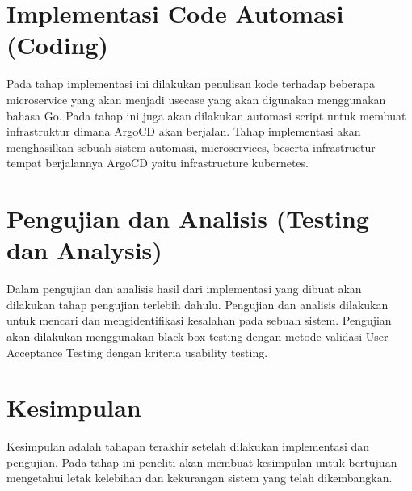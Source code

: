 \section{Implementasi Code Automasi (Coding)}
Pada tahap implementasi ini dilakukan penulisan kode terhadap beberapa microservice yang akan menjadi usecase yang akan digunakan menggunakan bahasa Go.
Pada tahap ini juga akan dilakukan automasi script untuk membuat infrastruktur dimana ArgoCD akan berjalan. Tahap implementasi akan menghasilkan sebuah sistem automasi, microservices,
beserta infrastructur tempat berjalannya ArgoCD yaitu infrastructure kubernetes.

\section{Pengujian dan Analisis (Testing dan Analysis)}
Dalam pengujian dan analisis hasil dari implementasi yang dibuat akan dilakukan tahap pengujian terlebih dahulu.
Pengujian dan analisis dilakukan untuk mencari dan mengidentifikasi kesalahan pada sebuah sistem. Pengujian akan dilakukan menggunakan black-box testing dengan metode validasi User Acceptance Testing
dengan kriteria usability testing.

\section{Kesimpulan}
Kesimpulan adalah tahapan terakhir setelah dilakukan implementasi dan pengujian. Pada tahap ini peneliti akan membuat kesimpulan untuk bertujuan
mengetahui letak kelebihan dan kekurangan sistem yang telah dikembangkan.
\newpage
